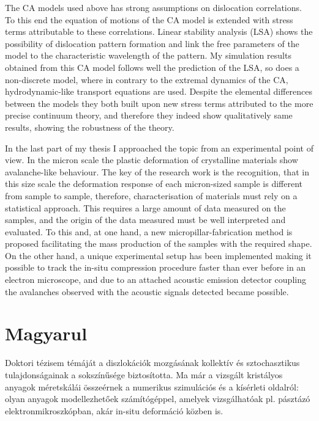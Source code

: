 The CA models used above has strong assumptions on dislocation correlations. To this end the equation of motions of the CA model is extended with stress terms attributable to these correlations. Linear stability analysis (LSA) shows the possibility of dislocation pattern formation and link the free parameters of the model to the characteristic wavelength of the pattern. My simulation results obtained from this CA model follows well the prediction of the LSA, so does a non-discrete model, where in contrary to the extremal dynamics of the CA, hydrodynamic-like transport equations are used. Despite the elemental differences between the models they both built upon new stress terms attributed to the more precise continuum theory, and therefore they indeed show qualitatively same results, showing the robustness of the theory.

In the last part of my thesis I approached the topic from an experimental point of view. In the micron scale the plastic deformation of crystalline materials show avalanche-like behaviour. The key of the research work is the recognition, that in this size scale the deformation response of each micron-sized sample is different from sample to sample, therefore, characterisation of materials must rely on a statistical approach. This requires a large amount of data measured on the samples, and the origin of the data measured must be well interpreted and evaluated. To this and, at one hand, a new micropillar-fabrication method is proposed facilitating the mass production of the samples with the required shape. On the other hand, a unique experimental setup has been implemented making it possible to track the in-situ compression procedure faster than ever before in an electron microscope, and due to an attached acoustic emission detector coupling the avalanches observed with the acoustic signals detected became possible.

\section*{Magyarul}
Doktori tézisem témáját a diszlokációk mozgásának kollektív és sztochasztikus tulajdonságainak a sokszínűsége biztosította. Ma már a vizsgált kristályos anyagok méretskálái összeérnek a numerikus szimulációs és a kísérleti oldalról: olyan anyagok modellezhetőek számítógéppel, amelyek vizsgálhatóak pl. pásztázó elektronmikroszkópban, akár in-situ deformáció közben is.

